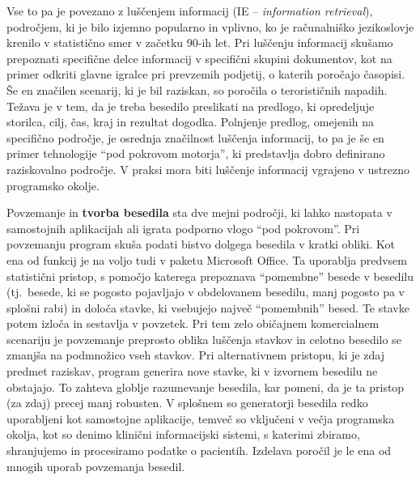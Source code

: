 \begin{multicols}{2}

Vse to pa je povezano z luščenjem informacij (IE – \textit{information retrieval}), področjem, ki je bilo izjemno popularno in vplivno, ko je računalniško jezikoslovje krenilo v statistično smer v začetku 90-ih let. Pri luščenju informacij skušamo prepoznati specifične delce informacij v specifični skupini dokumentov, kot na primer odkriti glavne igralce pri prevzemih podjetij, o katerih poročajo časopisi. Še en značilen scenarij, ki je bil raziskan, so poročila o terorističnih napadih. Težava je v tem, da je treba besedilo preslikati na predlogo, ki opredeljuje storilca, cilj, čas, kraj in rezultat dogodka. Polnjenje predlog, omejenih na specifično področje, je osrednja značilnost luščenja informacij, to pa je še en primer tehnologije “pod pokrovom motorja”, ki predstav\-lja dobro definirano raziskovalno področje. V praksi mora biti luščenje informacij vgrajeno v ustrezno programsko okolje.

Povzemanje in \textbf{tvorba besedila} sta dve mejni področji, ki lahko nastopata v samostojnih aplikacijah ali igrata podporno vlogo “pod pokrovom”. Pri povzemanju program skuša podati bistvo dolgega besedila v kratki obliki. Kot ena od funkcij je na voljo tudi v paketu Microsoft Office. Ta uporab\-lja predvsem statistični pristop, s pomočjo katerega prepoznava “pomembne” besede v besedilu (tj.~besede, ki se pogosto pojav\-ljajo v obdelovanem besedilu, manj pogosto pa v splošni rabi) in določa stavke, ki vsebujejo naj\-več “pomembnih” besed. Te stavke potem izloča in sestav\-lja v povzetek. Pri tem zelo običajnem komercialnem scenariju je povzemanje preprosto oblika luščenja stavkov in celotno besedilo se zmanjša na podmnožico vseh stavkov. Pri alternativnem pristopu, ki je zdaj predmet raziskav, program generira nove stavke, ki v izvornem besedilu ne obstajajo. To zah\-teva glob\-lje razumevanje besedila, kar po\-meni, da je ta pristop (za zdaj) precej manj robusten. V splošnem so generatorji besedila redko uporab\-ljeni kot samostojne aplikacije, temveč so vključeni v večja programska okolja, kot so denimo klinični informacij\-ski sistemi, s katerimi zbiramo, shranjujemo in procesiramo podatke o pacientih. Izdelava poročil je le ena od mnogih uporab povzemanja besedil.



\end{multicols}
